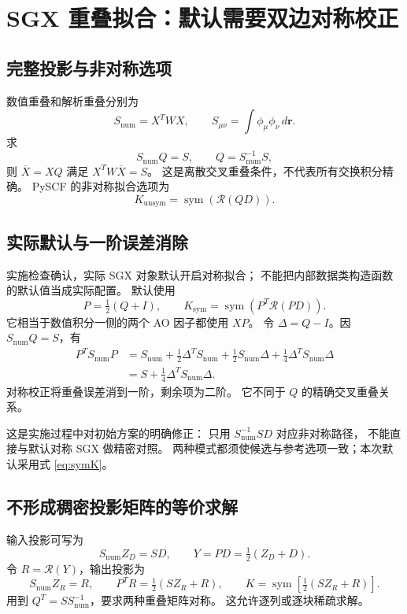 \documentclass[UTF8,fontset=fandol,11pt,a4paper]{ctexart}
\numberwithin{equation}{section}
\newcommand{\sym}{\operatorname{sym}}
\begin{document}
\section{SGX 重叠拟合：默认需要双边对称校正}
\label{sec:overlap}
\subsection{完整投影与非对称选项}
数值重叠和解析重叠分别为
\begin{equation}
S_{\mathrm{num}}=X^TWX,\qquad
S_{\mu\nu}=\int\phi_\mu\phi_\nu\,d\bm r.
\end{equation}
求
\begin{equation}
S_{\mathrm{num}}Q=S,\qquad Q=S_{\mathrm{num}}^{-1}S,
\label{eq:Q}
\end{equation}
则 \(\overline X=XQ\) 满足 \(X^TW\overline X=S\)。
这是离散交叉重叠条件，不代表所有交换积分精确。
PySCF 的非对称拟合选项为
\begin{equation}
K_{\mathrm{unsym}}=\sym(\mathcal R(QD)).
\end{equation}

\subsection{实际默认与一阶误差消除}
实施检查确认，实际 SGX 对象默认开启对称拟合；
不能把内部数据类构造函数的默认值当成实际配置。
默认使用
\begin{equation}
P=\tfrac12(Q+I),\qquad
K_{\mathrm{sym}}=\sym(P^T\mathcal R(PD)).
\label{eq:symK}
\end{equation}
它相当于数值积分一侧的两个 AO 因子都使用 \(XP\)。
令 \(\Delta=Q-I\)。因 \(S_{\mathrm{num}}Q=S\)，有
\begin{align}
P^TS_{\mathrm{num}}P
&=S_{\mathrm{num}}
+\tfrac12\Delta^TS_{\mathrm{num}}
+\tfrac12S_{\mathrm{num}}\Delta
+\tfrac14\Delta^TS_{\mathrm{num}}\Delta\\
&=S+\tfrac14\Delta^TS_{\mathrm{num}}\Delta.
\end{align}
对称校正将重叠误差消到一阶，剩余项为二阶。
它不同于 \(Q\) 的精确交叉重叠关系。

这是实施过程中对初始方案的明确修正：
只用 \(S_{\mathrm{num}}^{-1}SD\) 对应非对称路径，
不能直接与默认对称 SGX 做精密对照。
两种模式都须使候选与参考选项一致；本次默认采用式 \eqref{eq:symK}。

\subsection{不形成稠密投影矩阵的等价求解}
输入投影可写为
\begin{equation}
S_{\mathrm{num}}Z_D=SD,\qquad
Y=PD=\tfrac12(Z_D+D).
\label{eq:inputsolve}
\end{equation}
令 \(R=\mathcal R(Y)\)，输出投影为
\begin{equation}
S_{\mathrm{num}}Z_R=R,\qquad
P^TR=\tfrac12(SZ_R+R),\qquad
K=\sym\!\left[\tfrac12(SZ_R+R)\right].
\label{eq:outputsolve}
\end{equation}
用到 \(Q^T=SS_{\mathrm{num}}^{-1}\)，要求两种重叠矩阵对称。
这允许逐列或逐块稀疏求解。
\end{document}
